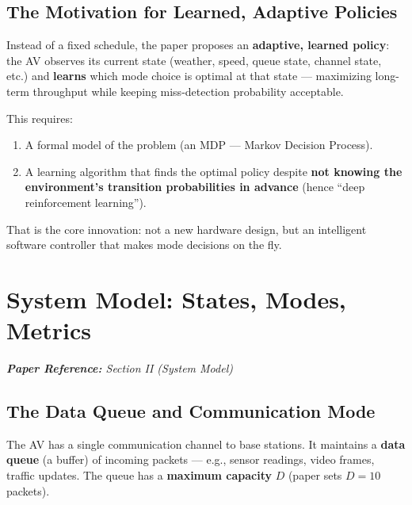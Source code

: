 \documentclass[12pt,a4paper]{article}
\begin{document}
\subsection{The Motivation for Learned, Adaptive Policies}

Instead of a fixed schedule, the paper proposes an \textbf{adaptive, learned policy}: the AV observes its current state (weather, speed, queue state, channel state, etc.) and \textbf{learns} which mode choice is optimal at that state --- maximizing long-term throughput while keeping miss-detection probability acceptable.

This requires:
\begin{enumerate}
    \item A formal model of the problem (an MDP --- Markov Decision Process).
    \item A learning algorithm that finds the optimal policy despite \textbf{not knowing the environment's transition probabilities in advance} (hence ``deep reinforcement learning'').
\end{enumerate}

That is the core innovation: not a new hardware design, but an intelligent software controller that makes mode decisions on the fly.

\section{System Model: States, Modes, Metrics}

\noindent\textit{\textbf{Paper Reference:} Section II (System Model)}

\subsection{The Data Queue and Communication Mode}

The AV has a single communication channel to base stations. It maintains a \textbf{data queue} (a buffer) of incoming packets --- e.g., sensor readings, video frames, traffic updates. The queue has a \textbf{maximum capacity} $D$ (paper sets $D = 10$ packets).
\end{document}
